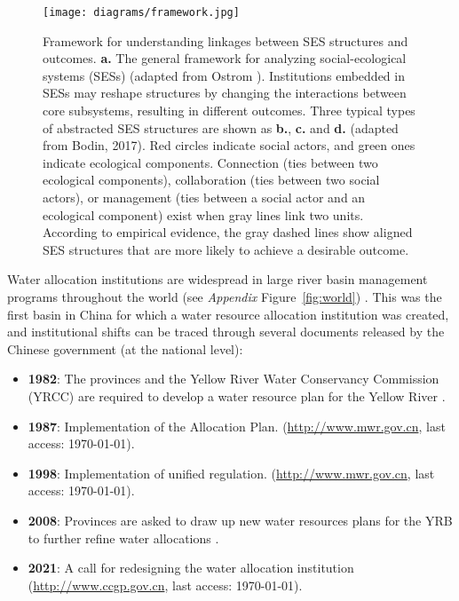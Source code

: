 \documentclass[default, sn-standardnature]{sn-jnl}
\begin{document}
\begin{figure}[!bh]
	\centering
	\texttt{[image: diagrams/framework.jpg]}
	\caption{
		Framework for understanding linkages between SES structures and outcomes.
		\textbf{a.} The general framework for analyzing social-ecological systems (SESs) (adapted from Ostrom \cite{ostrom2009}). Institutions embedded in SESs may reshape structures by changing the interactions between core subsystems, resulting in different outcomes.
        Three typical types of abstracted SES structures are shown as \textbf{b.}, \textbf{c.} and \textbf{d.} (adapted from Bodin, 2017)\cite{bodin2017b}. Red circles indicate social actors, and green ones indicate ecological components. Connection (ties between two ecological components), collaboration (ties between two social actors), or management (ties between a social actor and an ecological component) exist when gray lines link two units. According to empirical evidence, the gray dashed lines show aligned SES structures that are more likely to achieve a desirable outcome.
        }
    \label{framework}
\end{figure}

Water allocation institutions are widespread in large river basin management programs throughout the world (see \textit{Appendix} Figure~\ref{fig:world}) \cite{speed2013}.
This was the first basin in China for which a water resource allocation institution was created, and institutional shifts can be traced through several documents released by the Chinese government (at the national level)\cite{wang2019e}:
\begin{itemize}
    \item \textbf{1982}: The provinces and the Yellow River Water Conservancy Commission (YRCC) are required to develop a water resource plan for the Yellow River \cite{wang2019d, wang2019e}.
    \item \textbf{1987}: Implementation of the Allocation Plan. (\href{http://www.gov.cn/zhengce/content/2011-03/30/content_3138.htm#}{http://www.mwr.gov.cn}, last access: \today).
    \item \textbf{1998}: Implementation of unified regulation. (\href{http://www.mwr.gov.cn/ztpd/2013ztbd/2013fxkh/fxkhswcbcs/cs/flfg/201304/t20130411_433489.html}{http://www.mwr.gov.cn}, last access: \today).
    \item \textbf{2008}: Provinces are asked to draw up new water resources plans for the YRB to further refine water allocations \cite{wang2019d,wang2019e}.
    \item \textbf{2021}: A call for redesigning the water allocation institution (\href{http://www.ccgp.gov.cn/cggg/zygg/gkzb/202107/t20210721_16591901.htm}{http://www.ccgp.gov.cn}, last access: \today).
\end{itemize}
\end{document}
